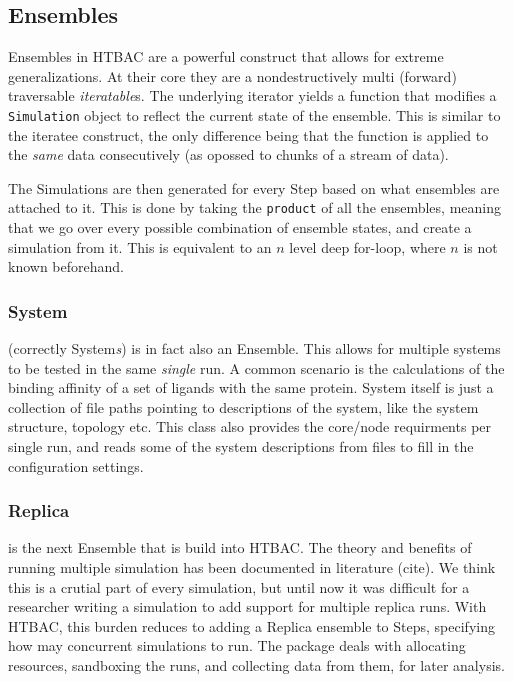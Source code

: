 \subsection{Ensembles}

Ensembles in HTBAC are a powerful construct that allows for extreme generalizations. At their core they are a nondestructively multi (forward) traversable \emph{iteratable}s. The underlying iterator yields a function that modifies a \texttt{Simulation} object to reflect the current state of the ensemble. This is similar to the iteratee construct, the only difference being that the function is applied to the \emph{same} data consecutively (as opossed to chunks of a stream of data).

The Simulations are then generated for every Step based on what ensembles are attached to it. This is done by taking the \texttt{product} of all the ensembles, meaning that we go over every possible combination of ensemble states, and create a simulation from it. This is equivalent to an $n$ level deep for-loop, where $n$ is not known beforehand.

\subsubsection{System}

(correctly System\emph{s}) is in fact also an Ensemble. This allows for multiple systems to be tested in the same \emph{single} run. A common scenario is the calculations of the binding affinity of a set of ligands with the same protein. System itself is just a collection of file paths pointing to descriptions of the system, like the system structure, topology etc. This class also provides the core/node requirments per single run, and reads some of the system descriptions from files to fill in the configuration settings.

\subsubsection{Replica}

is the next Ensemble that is build into HTBAC. The theory and benefits of  running multiple simulation has been documented in literature (cite). We think this is a crutial part of every simulation, but until now it was difficult for a researcher writing a simulation to add support for multiple replica runs. With HTBAC, this burden reduces to adding a Replica ensemble to Steps, specifying how may concurrent simulations to run. The package deals with allocating resources, sandboxing the runs, and collecting data from them, for later analysis.

